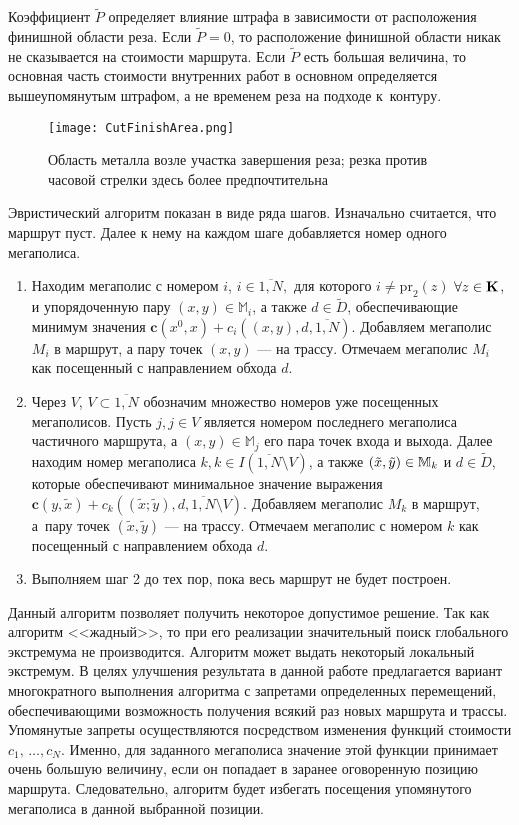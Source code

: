 Коэффициент $\tilde{P}$
определяет влияние штрафа в зависимости от расположения финишной области реза.
Если
$\tilde{P}=0$,
то расположение финишной области никак не
сказывается на стоимости маршрута.
Если $\tilde{P}$
есть большая величина,
то основная часть стоимости внутренних
работ в основном определяется вышеупомянутым штрафом,
а не временем реза на подходе к~контуру.

\begin{figure}[H]
  \center
  \texttt{[image: CutFinishArea.png]}
  \caption{
    Область металла возле участка завершения реза;
    резка против часовой стрелки здесь более предпочтительна
  }
  \label{FinishCutArea}
\end{figure}

Эвристический алгоритм показан в виде ряда шагов.
Изначально считается, что маршрут пуст.
Далее к нему на каждом шаге добавляется номер одного мегаполиса.

\begin{enumerate}
  \item
  Находим мегаполис с номером $i$, $i\in \overline{1,N},$
  для которого
  $i\neq \mbox{pr}_2(z)$ $\forall z \hm \in \mathbf{K}$,
  и упорядоченную пару
  $(x,y)\in \mathbb{M}_i$,
  а также $d\in \tilde{D}$,
  обеспечивающие минимум значения
  $\mathbf{c}(x^0,x)+c_i((x,y),d,\overline{1,N})$.
  Добавляем мегаполис $M_i$ в маршрут,
  а пару точек $(x,y)$ --- на трассу.
  Отмечаем мегаполис $M_i$ как посещенный с направлением обхода $d$.

  \item
  Через $V$, $V\subset \overline{1,N}$
  обозначим множество номеров уже посещенных мегаполисов.
  Пусть $j,j\in V$
  является номером последнего мегаполиса частичного маршрута,
  а $(x,y)\in \mathbb{M}_j$ его пара точек входа и выхода.
  Далее находим номер мегаполиса
  $k,k\in I(\overline{1,N}\setminus V)$,
  а также
  $(\tilde{x},\tilde{y}) \hm \in \mathbb{M}_k$ и $d\in \tilde{D}$,
  которые обеспечивают минимальное значение выражения
  $\mathbf{c}(y,\tilde{x})+c_k((\tilde{x};\tilde{y}),d,\overline{1,N}\setminus V)$.
  Добавляем мегаполис $M_k$ в маршрут, а~пару точек $(\tilde{x},\tilde{y})$
  --- на трассу.
  Отмечаем мегаполис с номером $k$ как посещенный с направлением
  обхода $d$.

  \item
  Выполняем шаг 2 до тех пор,
  пока весь маршрут не будет построен.
\end{enumerate}

Данный алгоритм позволяет получить некоторое допустимое решение.
Так как алгоритм <<жадный>>,
то при его реализации значительный поиск глобального экстремума не производится.
Алгоритм может выдать некоторый локальный экстремум.
В целях улучшения результата в данной работе предлагается вариант
многократного выполнения алгоритма с запретами определенных перемещений,
обеспечивающими возможность получения всякий раз новых
маршрута и трассы.
Упомянутые запреты осуществляются посредством изменения функций
стоимости $c_1,\,\dots,c_N$.
Именно, для заданного мегаполиса значение этой функции
принимает очень большую величину,
если он попадает в заранее оговоренную позицию маршрута.
Следовательно, алгоритм будет избегать посещения упомянутого мегаполиса
в данной выбранной позиции.

